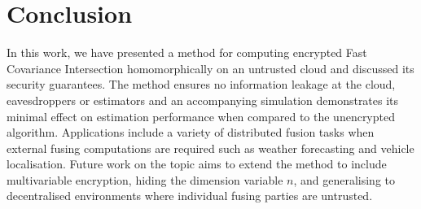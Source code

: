 \documentclass[letterpaper, 10 pt, conference]{ieeeconf}
\begin{document}
% 
%                                               
%                                               
%                                               
% 
\section{Conclusion}\label{sec:conclusion}
In this work, we have presented a method for computing encrypted Fast Covariance Intersection homomorphically on an untrusted cloud and discussed its security guarantees. The method ensures no information leakage at the cloud, eavesdroppers or estimators and an accompanying simulation demonstrates its minimal effect on estimation performance when compared to the unencrypted algorithm. Applications include a variety of distributed fusion tasks when external fusing computations are required such as weather forecasting and vehicle localisation. Future work on the topic aims to extend the method to include multivariable encryption, hiding the dimension variable $n$, and generalising to decentralised environments where individual fusing parties are untrusted.




% 
%                                            
%                                            
%                                            
% 


\end{document}
